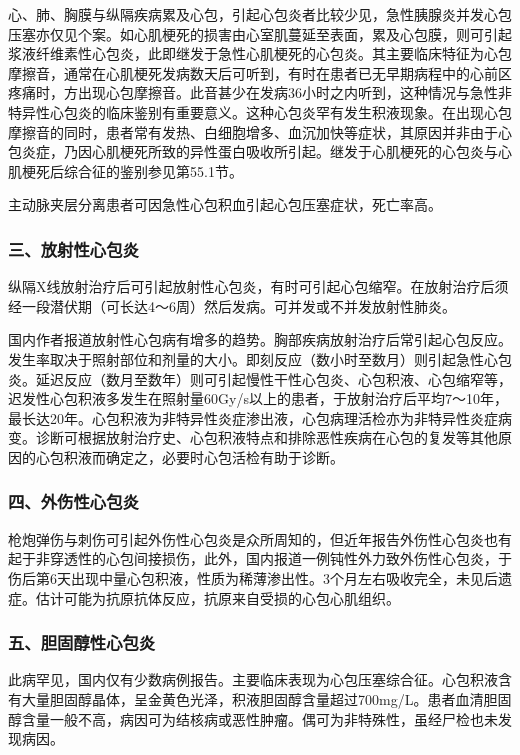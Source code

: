 心、肺、胸膜与纵隔疾病累及心包，引起心包炎者比较少见，急性胰腺炎并发心包压塞亦仅见个案。如心肌梗死的损害由心室肌蔓延至表面，累及心包膜，则可引起浆液纤维素性心包炎，此即继发于急性心肌梗死的心包炎。其主要临床特征为心包摩擦音，通常在心肌梗死发病数天后可听到，有时在患者已无早期病程中的心前区疼痛时，方出现心包摩擦音。此音甚少在发病36小时之内听到，这种情况与急性非特异性心包炎的临床鉴别有重要意义。这种心包炎罕有发生积液现象。在出现心包摩擦音的同时，患者常有发热、白细胞增多、血沉加快等症状，其原因并非由于心包炎症，乃因心肌梗死所致的异性蛋白吸收所引起。继发于心肌梗死的心包炎与心肌梗死后综合征的鉴别参见第55.1节。

主动脉夹层分离患者可因急性心包积血引起心包压塞症状，死亡率高。

\subsubsection{三、放射性心包炎}

纵隔X线放射治疗后可引起放射性心包炎，有时可引起心包缩窄。在放射治疗后须经一段潜伏期（可长达4～6周）然后发病。可并发或不并发放射性肺炎。

国内作者报道放射性心包病有增多的趋势。胸部疾病放射治疗后常引起心包反应。发生率取决于照射部位和剂量的大小。即刻反应（数小时至数月）则引起急性心包炎。延迟反应（数月至数年）则可引起慢性干性心包炎、心包积液、心包缩窄等，迟发性心包积液多发生在照射量60Gy/s以上的患者，于放射治疗后平均7～10年，最长达20年。心包积液为非特异性炎症渗出液，心包病理活检亦为非特异性炎症病变。诊断可根据放射治疗史、心包积液特点和排除恶性疾病在心包的复发等其他原因的心包积液而确定之，必要时心包活检有助于诊断。

\subsubsection{四、外伤性心包炎}

枪炮弹伤与刺伤可引起外伤性心包炎是众所周知的，但近年报告外伤性心包炎也有起于非穿透性的心包间接损伤，此外，国内报道一例钝性外力致外伤性心包炎，于伤后第6天出现中量心包积液，性质为稀薄渗出性。3个月左右吸收完全，未见后遗症。估计可能为抗原抗体反应，抗原来自受损的心包心肌组织。

\subsubsection{五、胆固醇性心包炎}

此病罕见，国内仅有少数病例报告。主要临床表现为心包压塞综合征。心包积液含有大量胆固醇晶体，呈金黄色光泽，积液胆固醇含量超过700mg/L。患者血清胆固醇含量一般不高，病因可为结核病或恶性肿瘤。偶可为非特殊性，虽经尸检也未发现病因。

